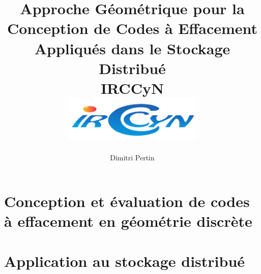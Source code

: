 
\makeindex



\title{
    {Approche Géométrique pour la Conception de Codes à Effacement Appliqués
    dans le Stockage Distribué}\\
    {\large IRCCyN}\\
    {\includegraphics[width=0.5\textwidth]{img/logo_irccyn.pdf}}
}
\author{Dimitri Pertin}
\date {}

\maketitle

\newpage

\tableofcontents

\part{Conception et évaluation de codes à effacement en géométrie discrète}







\part{Application au stockage distribué}







\newpage

\printbibliography[
]

\printindex


